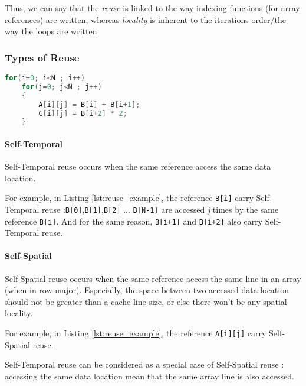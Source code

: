\documentclass[paper=a4, fontsize=11pt]{scrartcl}
\numberwithin{equation}{section}        %
\numberwithin{figure}{section}          %
\numberwithin{table}{section}               %
\begin{document}
            Thus, we can say that the \textit{reuse} is linked to the way indexing
            functions (for array references) are written, whereas \textit{locality} is
            inherent to the iterations order/the way the loops are written.

        \subsubsection{Types of Reuse}
            
\begin{lstlisting}[frame=single, language=C, caption=Reuse example, label={lst:reuse_example}]
for(i=0; i<N ; i++)
    for(j=0; j<N ; j++)
    {
        A[i][j] = B[i] + B[i+1];
        C[i][j] = B[i+2] * 2;
    }
\end{lstlisting}

            \paragraph{Self-Temporal}
                Self-Temporal reuse occurs when the same reference access the same
                data location.
                
                For example, in Listing \ref{lst:reuse_example}, the reference \verb'B[i]' carry Self-Temporal
                reuse :\verb'B[0]',\verb'B[1]',\verb'B[2]' ... \verb'B[N-1]' are accessed
                \textit{j} times by the same reference \verb'B[i]'.
                And for the same reason, \verb'B[i+1]' and \verb'B[i+2]' also carry Self-Temporal reuse.

            \paragraph{Self-Spatial}
                Self-Spatial reuse occurs when the same reference access the same
                line in an array (when in row-major). Especially, the space between
                two accessed data location should not be greater than a cache line size,
                or else there won't be any spatial locality.

                For example, in Listing \ref{lst:reuse_example}, the reference \verb'A[i][j]' carry
                Self-Spatial reuse.

                Self-Temporal reuse can be considered as a special case of
                Self-Spatial reuse : accessing the same data location mean that
                the same array line is also accessed.
\end{document}
